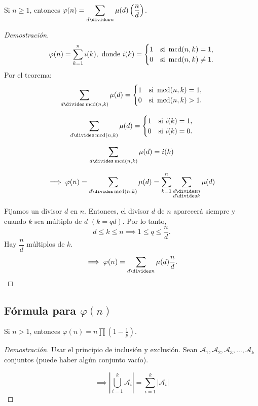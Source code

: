 \begin{theorem}
	Si $n\geq1$, entonces $\displaystyle\varphi(n)=\sum_{d\divides n}\mu(d)\left(\frac{n}{d}\right)$.
	\begin{proof}[Demostración]
		\[\varphi(n)=\sum_{k=1}^{n}i(k), \text{ donde } i(k)=\begin{cases}
		1 & \text{si } \operatorname{mcd}(n,k)=1,\\
		0 & \text{si } \operatorname{mcd}(n,k)\neq1.
		\end{cases}\]
		Por el teorema:
		\[\sum_{d\divides\mcd(n,k)}\mu(d)=\begin{cases}
		1 & \text{si }\mcd(n,k)=1,\\
		0 & \text{si } \mcd(n,k)>1.
		\end{cases}\]
		
		\[\sum_{d\divides\mcd(n,k)}\mu(d)=\begin{cases}
		1 & \text{si } i(k)=1,\\
		0 & \text{si } i(k)=0.
		\end{cases}\]
		
		\[\sum_{d\divides\mcd(n,k)}\mu(d)=i(k)\]
		
		\[\implies\varphi(n)=\sum_{d\divides\mcd(n,k)}\mu(d)=\sum_{k=1}^{n}\sum_{\substack{d\divides n\\
		d\divides k}}\mu(d)\]
	
		Fijamos un divisor $d$ en $n$. Entonces, el divisor $d$ de $n$ aparecerá siempre y cuando $k$ sea múltiplo de $d$ $(k=qd)$. Por lo tanto,
		\[d\leq k\leq n\implies 1\leq q\leq\frac{n}{d}.\]
		Hay $\dfrac{n}{d}$ múltiplos de $k$.
		\[\implies\varphi(n)=\sum_{d\divides n}\mu(d)\frac{n}{d}.\]
	\end{proof}
\end{theorem}

\subsection{Fórmula para $\varphi(n)$}

\begin{theorem}
	Si $n>1$, entonces $\displaystyle\varphi(n)=n\prod\left(1-\frac{1}{p}\right)$.
	\begin{proof}[Demostración]
		Usar el principio de inclusión y exclusión. Sean $\mathcal{A}_1,\mathcal{A}_2,\mathcal{A}_3,\ldots,\mathcal{A}_k$ conjuntos (puede haber algún conjunto vacío).
		
		\[
		\displaystyle\implies\left|\bigcup^{k}_{i=1}\mathcal{A}_{i}\right|=\sum_{i=1}^{k}|\mathcal{A}_{i}|
		\]
	\end{proof}
\end{theorem}
